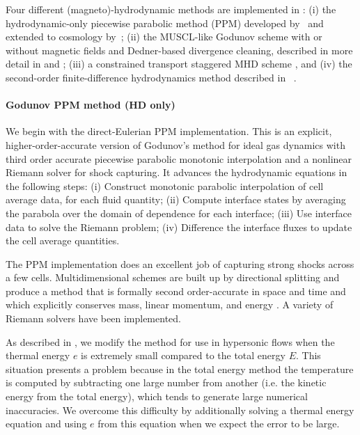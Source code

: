 Four different (magneto)-hydrodynamic methods are implemented in
\enzo: (i) the hydrodynamic-only piecewise parabolic method (PPM)
developed by~\citet{1984JCoPh..54..174C} and extended to cosmology
by~\citet{1995CoPhC..89..149B}; (ii) the MUSCL-like Godunov scheme
\citep{1977JCoPh..23..276V} with or without magnetic fields and Dedner-based
divergence cleaning, described in more detail in
\citet{WangAbelZhang08} and \citet{WangAbel09}; (iii) a constrained
transport staggered MHD scheme \citep{Collins10}, and (iv) the
second-order finite-difference hydrodynamics method described in
\zeus~\citep{Stone92a,Stone92b}.

\paragraph{Godunov PPM method (HD only)}

We begin with the direct-Eulerian PPM implementation.  This is an
explicit, higher-order-accurate version of Godunov's method for ideal
gas dynamics with third order accurate piecewise parabolic monotonic
interpolation and a nonlinear Riemann solver for shock capturing.  It
advances the hydrodynamic equations in the following steps:
(i) Construct monotonic parabolic interpolation of cell average data,
for each fluid quantity;
(ii) Compute interface states by averaging the parabola over the
domain of dependence for each interface;
(iii) Use interface data to solve the Riemann problem;
(iv) Difference the interface fluxes to update the cell average
quantities.

The PPM implementation does an excellent job of capturing strong
shocks across a few cells.  Multidimensional schemes are built up by
directional splitting and produce a method that is formally second
order-accurate in space and time and which explicitly conserves mass,
linear momentum, and energy \citep{Hawley84, Norman86}.  A variety of
Riemann solvers have been implemented.

As described in \citet{Bryan95}, we modify the method for use in
hypersonic flows when the thermal energy $e$ is extremely small
compared to the total energy $E$.  This situation presents a problem
because in the total energy method the temperature is computed by
subtracting one large number from another (i.e. the kinetic energy
from the total energy), which tends to generate large numerical
inaccuracies. We overcome this difficulty by additionally solving a
thermal energy equation and using $e$ from this equation when we
expect the error to be large.

